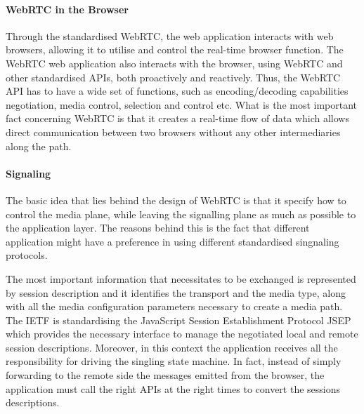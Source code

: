 \paragraph{WebRTC in the Browser}
 
Through the standardised WebRTC, the web application interacts with web browsers, allowing it to utilise
and control the real-time browser function. The WebRTC web application also interacts with the browser,
using WebRTC and other standardised APIs, both proactively and reactively. Thus, the WebRTC API has to have
a wide set of functions, such as encoding/decoding capabilities negotiation, media control, selection and 
control etc. What is the most important fact concerning WebRTC  is that it creates a real-time flow of data 
which allows direct communication between two browsers without any other intermediaries along the path. 


\paragraph{Signaling} 
The basic idea that lies behind the design of WebRTC is that it specify how to control the media plane, while leaving
the signalling plane as much as possible to the application layer. The reasons behind this is the fact that different
application might have a preference in using different standardised singnaling protocols. 

The most important information that necessitates to be exchanged is represented by session description and it identifies
the transport and the media type, along with all the media configuration parameters necessary to create a media path.
The IETF is standardising the JavaScript Session Establishment Protocol JSEP which  provides the necessary interface 
to manage the negotiated local and remote session descriptions. Moreover, in this context the application receives all
the responsibility for driving the singling state machine. In fact, instead of simply forwarding to the remote side the
messages emitted from the browser, the application must call the right APIs at the right times to convert the sessions descriptions. 


